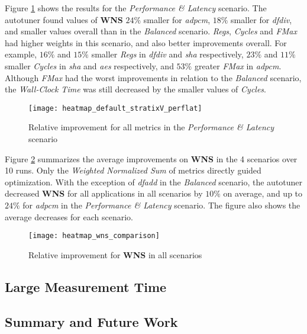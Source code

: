 Figure \ref{fig:perflat} shows the results for the \textit{Performance \&
Latency} scenario.  The autotuner found values of \textbf{WNS} $24\%$ smaller
for \textit{adpcm}, $18\%$ smaller for \textit{dfdiv}, and smaller values
overall than in the \textit{Balanced} scenario. \textit{Regs}, \textit{Cycles}
and \textit{FMax} had higher weights in this scenario, and also better
improvements overall.  For example, $16\%$ and $15\%$ smaller \textit{Regs} in
\textit{dfdiv} and \textit{sha} respectively, $23\%$ and $11\%$ smaller
\textit{Cycles} in \textit{sha} and \textit{aes} respectively, and $53\%$
greater \textit{FMax} in \textit{adpcm}. Although \textit{FMax} had the worst
improvements in relation to the \textit{Balanced} scenario, the
\textit{Wall-Clock Time} was still decreased by the smaller values of
\textit{Cycles}.

\begin{figure}[htpb]
    \centering
    \texttt{[image: heatmap\_default\_stratixV\_perflat]}
    \caption{Relative improvement for all metrics in the \textit{Performance \& Latency} scenario}
    \label{fig:perflat}
\end{figure}

Figure \ref{fig:wns-comp} summarizes the average improvements on \textbf{WNS}
in the 4 scenarios over 10 runs. Only the \textit{Weighted Normalized Sum} of
metrics directly guided optimization. With the exception of \textit{dfadd} in
the \textit{Balanced} scenario, the autotuner decreased \textbf{WNS} for all
applications in all scenarios by $10\%$ on average, and up to $24\%$ for
\textit{adpcm} in the \textit{Performance \& Latency} scenario. The figure also
shows the average decreases for each scenario.

\begin{figure}[htpb]
    \centering
    \texttt{[image: heatmap\_wns\_comparison]}
    \caption{Relative improvement for \textbf{WNS} in all scenarios}
    \label{fig:wns-comp}
\end{figure}

\subsection{Large Measurement Time}
\label{sec:bigtime}

\subsection{Summary and Future Work}
\label{sec:FPGAconcl}

